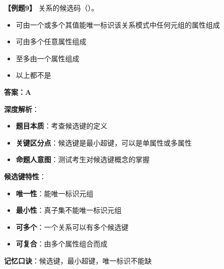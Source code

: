 \documentclass[12pt, a4paper]{article}
\newenvironment{bluebox}[1]{%
  \begin{trivlist}
  \item[\hskip\labelsep \textbf{#1}]
  \setlength{\parskip}{0.5ex}
  \setlength{\itemsep}{0.5ex}
}{%
  \end{trivlist}
}
\begin{document}
\begin{bluebox}{例题9：候选键概念}
	\textbf{【例题9】} 关系的候选码（\quad）。

	\begin{itemize}
		\item[A)] 可由一个或多个其值能唯一标识该关系模式中任何元组的属性组成
		\item[B)] 可由多个任意属性组成
		\item[C)] 至多由一个属性组成
		\item[D)] 以上都不是
	\end{itemize}

	\textbf{答案：A}

	\textbf{深度解析}：

	\begin{itemize}
		\item \textbf{题目本质}：考查候选键的定义
		\item \textbf{关键区分点}：候选键是最小超键，可以是单属性或多属性
		\item \textbf{命题人意图}：测试考生对候选键概念的掌握
	\end{itemize}

	\textbf{候选键特性}：

	\begin{itemize}
		\item \textbf{唯一性}：能唯一标识元组
		\item \textbf{最小性}：真子集不能唯一标识元组
		\item \textbf{可多个}：一个关系可以有多个候选键
		\item \textbf{可复合}：由多个属性组合而成
	\end{itemize}

	\textbf{记忆口诀}：候选键，最小超键，唯一标识不能缺
\end{bluebox}
\end{document}
